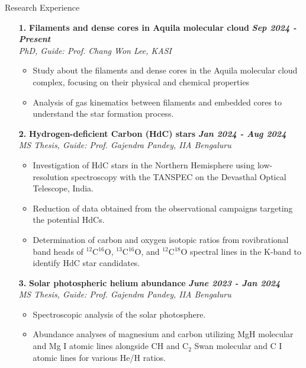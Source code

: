 \documentclass{resume} %
\begin{document}
\begin{rSection}{Research Experience}
\begin{enumerate}
\item[\textbf{1.}] {\bf Filaments and dense cores in Aquila molecular cloud} \hfill {\em \bf Sep 2024 - Present}\\
    \textit{PhD, Guide: Prof. Chang Won Lee, KASI}
    \begin{itemize}
    \itemsep -5pt
        \item Study about the filaments and dense cores in the Aquila molecular cloud complex, focusing on their physical and chemical properties
        \item Analysis of gas kinematics between filaments and embedded cores to understand the star formation process.
    \end{itemize}
\vspace{0.3cm}
    \item[\textbf{2.}] {\bf Hydrogen-deficient Carbon (HdC) stars} \hfill {\em \bf Jan 2024 - Aug 2024}\\
    \textit{MS Thesis, Guide: Prof. Gajendra Pandey, IIA Bengaluru}
    \begin{itemize}
    \itemsep -5pt
        \item Investigation of HdC stars in the Northern Hemisphere using low-resolution spectroscopy with the TANSPEC on the Devasthal Optical Telescope, India.
        \item Reduction of data obtained from the observational campaigns targeting the potential HdCs.
        \item Determination of carbon and oxygen isotopic ratios from rovibrational band heads of $^{12}$C$^{16}$O, $^{13}$C$^{16}$O, and $^{12}$C$^{18}$O spectral lines in the K-band to identify HdC star candidates.
    \end{itemize}
\vspace{0.3cm}
    \item[\textbf{3.}] {\bf Solar photospheric helium abundance} \hfill {\em \bf June 2023 - Jan 2024}\\
    \textit{MS Thesis, Guide: Prof. Gajendra Pandey, IIA Bengaluru}
    \begin{itemize}
    \itemsep -5pt
        \item Spectroscopic analysis of the solar photosphere.
        \item Abundance analyses of magnesium and carbon utilizing MgH molecular and Mg I atomic lines alongside CH and C$_{2}$ Swan molecular and C I atomic lines for various He/H ratios.

\end{itemize}
\end{enumerate}
\end{rSection}
\end{document}
